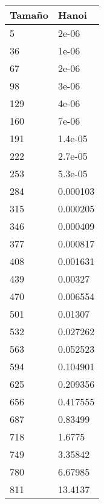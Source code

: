 \begin{tabular}[H]{|ll|}
\hline
\textbf{Tamaño} & \textbf{Hanoi} \\ \hline
5 & 2e-06 \\ \hline
36 & 1e-06 \\ \hline
67 & 2e-06 \\ \hline
98 & 3e-06 \\ \hline
129 & 4e-06 \\ \hline
160 & 7e-06 \\ \hline
191 & 1.4e-05 \\ \hline
222 & 2.7e-05 \\ \hline
253 & 5.3e-05 \\ \hline
284 & 0.000103 \\ \hline
315 & 0.000205 \\ \hline
346 & 0.000409 \\ \hline
377 & 0.000817 \\ \hline
408 & 0.001631 \\ \hline
439 & 0.00327 \\ \hline
470 & 0.006554 \\ \hline
501 & 0.01307 \\ \hline
532 & 0.027262 \\ \hline
563 & 0.052523 \\ \hline
594 & 0.104901 \\ \hline
625 & 0.209356 \\ \hline
656 & 0.417555 \\ \hline
687 & 0.83499 \\ \hline
718 & 1.6775 \\ \hline
749 & 3.35842 \\ \hline
780 & 6.67985 \\ \hline
811 & 13.4137 \\ \hline

\end{tabular}